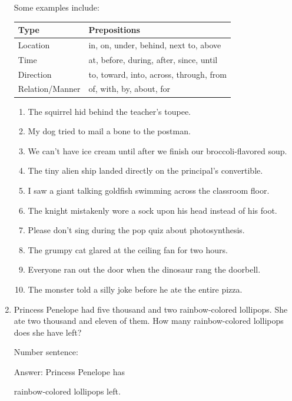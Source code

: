 \documentclass{tufte-book}
\providecommand{\tabularnewline}{\\}
\begin{document}
\begin{enumerate}
{  Some examples include:\\
  \begin{center}
    \begin{tabular}{>{\raggedright}p{2cm}>{\raggedright}p{3cm}}
      \hline 
      \textbf{Type}  & \textbf{Prepositions} \tabularnewline
      \hline 
      Location  & in, on, under, behind, next to, above \tabularnewline
      Time  & at, before, during, after, since, until \tabularnewline
      Direction  & to, toward, into, across, through, from \tabularnewline
      Relation/Manner  & of, with, by, about, for \tabularnewline
      \hline 
      \end{tabular}
          \end{center}}
  \begin{enumerate}
    \item The squirrel hid behind the teacher's toupee.
    \item My dog tried to mail a bone to the postman.
    \item We can't have ice cream until after we finish our broccoli-flavored soup.
    \item The tiny alien ship landed directly on the principal's convertible.
    \item I saw a giant talking goldfish swimming across the classroom floor.
    \item The knight mistakenly wore a sock upon his head instead of his foot.
    \item Please don't sing during the pop quiz about photosynthesis.
    \item The grumpy cat glared at the ceiling fan for two hours.
    \item Everyone ran out the door when the dinosaur rang the doorbell.
    \item The monster told a silly joke before he ate the entire pizza.
  \end{enumerate}

  \item Princess Penelope had five thousand and two rainbow-colored lollipops.
  She ate two thousand and eleven of them.
  How many rainbow-colored lollipops does she have left?\bigskip\par
Number sentence: \dotfill\bigskip\par
Answer: Princess Penelope has 
\dotfill\bigskip\par\mbox{}\dotfill\bigskip\par\mbox{}\dotfill\bigskip
 rainbow-colored lollipops left.
\end{enumerate}
\end{document}
